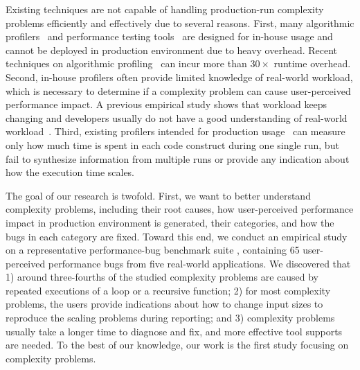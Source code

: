 Existing techniques
are not capable of handling production-run complexity problems
efficiently and effectively due to several reasons. 
First, many algorithmic profilers~\cite{Aprof1,Aprof2,AlgoProf} and performance 
testing tools~\cite{Alabama,PerfBlower} are designed for in-house usage and cannot be 
deployed in production environment due to heavy overhead. 
Recent techniques on algorithmic 
profiling~\cite{Aprof1,Aprof2,AlgoProf} can incur more than $30\times$ runtime overhead.
Second, in-house profilers often  provide limited knowledge of real-world workload, which is necessary 
to determine if a complexity problem can cause user-perceived performance 
impact. A previous empirical study shows that workload keeps changing and 
developers usually do not have a good understanding of real-world workload~\citep{PerfBug}.  
Third, existing profilers intended for production usage~\cite{gprof,oprofile,LagHunter,IntroPerf}
can measure only how much time 
is spent in each code construct during one single run,
but fail to synthesize information from multiple runs
or provide any indication about how the execution time scales.


%
The goal of our research is twofold. First, we want to better 
understand  complexity problems, including 
their root causes, how user-perceived performance impact 
in production environment is generated,
their categories, 
and how the bugs in each category are
fixed.  Toward this end, 
we conduct an empirical study on a representative
performance-bug benchmark suite \cite{PerfBug,SongOOPSLA2014},
containing 65 user-perceived  performance bugs from five
real-world applications.  We discovered that 
1) around three-fourths of the studied complexity problems are
caused by repeated executions of a loop or a recursive function;
2) for most complexity problems,
the users provide indications about 
how to change input sizes to reproduce the scaling problems during reporting;
and 3) complexity problems usually take a longer time to diagnose and fix,
and more effective tool supports are needed. 
To the best of our knowledge, our work is the first study focusing on complexity problems.



